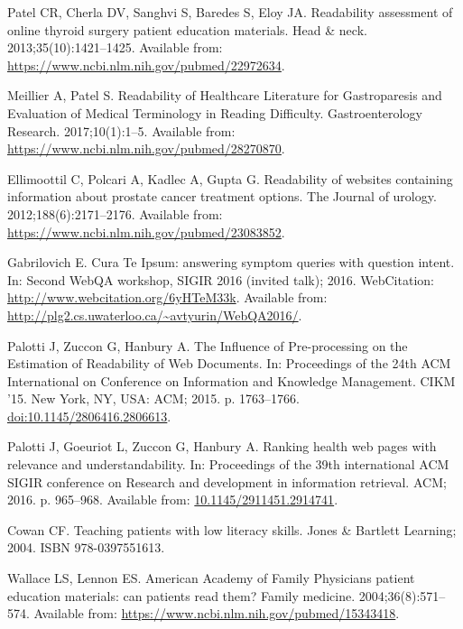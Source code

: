 \documentclass[10pt,a4paper]{article}
\begin{document}
\begin{thebibliography}{10}
	Patel CR, Cherla DV, Sanghvi S, Baredes S, Eloy JA.
	\newblock Readability assessment of online thyroid surgery patient education
	materials.
	\newblock Head \& neck. 2013;35(10):1421--1425.
	\newblock Available from: \url{https://www.ncbi.nlm.nih.gov/pubmed/22972634}.
	
	Meillier A, Patel S.
	\newblock Readability of Healthcare Literature for Gastroparesis and Evaluation
	of Medical Terminology in Reading Difficulty.
	\newblock Gastroenterology Research. 2017;10(1):1--5.
	\newblock Available from: \url{https://www.ncbi.nlm.nih.gov/pubmed/28270870}.
	
	Ellimoottil C, Polcari A, Kadlec A, Gupta G.
	\newblock Readability of websites containing information about prostate cancer
	treatment options.
	\newblock The Journal of urology. 2012;188(6):2171--2176.
	\newblock Available from: \url{https://www.ncbi.nlm.nih.gov/pubmed/23083852}.
	
	Gabrilovich E.
	\newblock Cura Te Ipsum: answering symptom queries with question intent.
	\newblock In: Second WebQA workshop, SIGIR 2016 (invited talk); 2016.
	WebCitation: \url{http://www.webcitation.org/6yHTeM33k}.
	\newblock Available from:
	\url{http://plg2.cs.uwaterloo.ca/~avtyurin/WebQA2016/}.
	
	Palotti J, Zuccon G, Hanbury A.
	\newblock The Influence of Pre-processing on the Estimation of Readability of
	Web Documents.
	\newblock In: Proceedings of the 24th ACM International on Conference on
	Information and Knowledge Management. CIKM '15. New York, NY, USA: ACM; 2015.
	p. 1763--1766.
	\newblock \href {http://dx.doi.org/10.1145/2806416.2806613}
	{doi:10.1145/2806416.2806613}.
	
	Palotti J, Goeuriot L, Zuccon G, Hanbury A.
	\newblock Ranking health web pages with relevance and understandability.
	\newblock In: Proceedings of the 39th international ACM SIGIR conference on
	Research and development in information retrieval. ACM; 2016. p. 965--968.
	\newblock Available from: \url{10.1145/2911451.2914741}.
	
	Cowan CF.
	\newblock Teaching patients with low literacy skills.
	\newblock Jones \& Bartlett Learning; 2004.
	\newblock ISBN 978-0397551613.
	
	Wallace LS, Lennon ES.
	\newblock American Academy of Family Physicians patient education materials:
	can patients read them?
	\newblock Family medicine. 2004;36(8):571--574.
	\newblock Available from: \url{https://www.ncbi.nlm.nih.gov/pubmed/15343418}.
	

\end{thebibliography}
\end{document}
